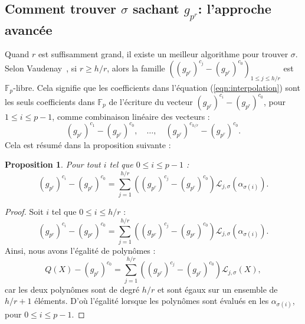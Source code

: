 \documentclass[a4paper, titlepage, 11pt]{article}
\newtheorem{prop}[theo]{Proposition}
\theoremstyle{definition}
\theoremstyle{remark}
\def\gf #1{\mathbb{F}_{#1}}
\begin{document}
\subsection{Comment trouver $\sigma$ sachant $g_{p^r}$: l'approche avancée}

Quand $r$ est suffisamment grand, il existe un meilleur algorithme pour trouver $\sigma$. Selon Vaudenay~\cite{vaudenay2000}, si $r \geqslant h/r$, alors la famille $\left((g_{p^r})^{c_{j}} - (g_{p^r})^{c_{0}} \right)_{1\leqslant j \leqslant h/r}$ est $\gf{p}$-libre.
Cela signifie que les coefficients dans l'équation (\ref{eqn:interpolation}) sont les seuls coefficients dans $\gf{p}$ de l'écriture du vecteur $(g_{p^r})^{c_{i}} - (g_{p^r})^{c_{0}}$, pour $1\leqslant i \leqslant p-1$, comme combinaison linéaire des vecteurs : $$(g_{p^r})^{c_{1}} - (g_{p^r})^{c_{0}},\quad \dots,\quad (g_{p^r})^{c_{{h/r}}} - (g_{p^r})^{c_{0}}.$$
Cela est résumé dans la proposition suivante :

\begin{prop}Pour tout $i$ tel que $0\leqslant i \leqslant p-1$ :
\begin{equation}\label{eqn:combLineaire}
(g_{p^r})^{c_i} - (g_{p^r})^{c_{0}} = \sum_{j=1}^{h/r} \left((g_{p^r})^{c_{j}} - (g_{p^r})^{c_{0}} \right)\mathcal L_{j,\sigma}(\alpha_{\sigma(i)}).
\end{equation}
\end{prop}

\begin{proof}
Soit $i$ tel que $0 \leqslant i \leqslant {h/r}$ :
$$(g_{p^r})^{c_i} - (g_{p^r})^{c_{0}} = \sum_{j=1}^{h/r} \left((g_{p^r})^{c_{j}} - (g_{p^r})^{c_{0}} \right)\mathcal L_{j,\sigma}(\alpha_{\sigma(i)}).$$
Ainsi, nous avons l'égalité de polynômes :
$$Q(X) - (g_{p^r})^{c_{0}} = \sum_{j=1}^{h/r} \left((g_{p^r})^{c_{j}} - (g_{p^r})^{c_{0}} \right)\mathcal L_{j,\sigma}(X),$$
car les deux polynômes sont de degré $h/r$ et sont égaux sur un ensemble de $h/r + 1$ éléments. D'où l'égalité lorsque les polynômes sont évalués en les $\alpha_{\sigma(i)}$, pour $0\leqslant i \leqslant p-1$.\end{proof}
\end{document}
